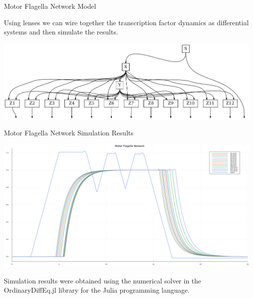 \documentclass{beamer}
\begin{document}
\begin{frame}{Motor Flagella Network Model}
    \begin{large}
        Using lenses we can wire together the transcription factor dynamics as differential systems and then simulate the results.

    \end{large}

    \begin{center}
        \includegraphics[scale=0.35]{motor_flagella_network.png}
    \end{center}

\end{frame}

\begin{frame}{Motor Flagella Network Simulation Results}

    \begin{center}
        \includegraphics[scale=0.20]{motor_flagella.png}
    \end{center}

    \begin{footnotesize}
        Simulation results were obtained using the numerical solver in the OrdinaryDiffEq.jl library for the Julia programming language.
    \end{footnotesize}
\end{frame}


\end{document}
